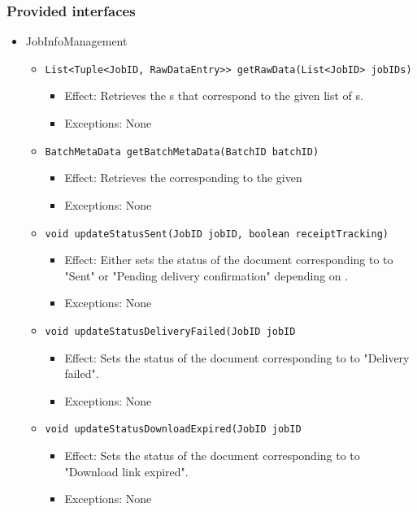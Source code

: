 \subsubsection*{Provided interfaces}
\begin{itemize}
    \item JobInfoManagement
    \begin{itemize}
        \item \texttt{List<Tuple<JobID, RawDataEntry>> getRawData(List<JobID> jobIDs)}
        \begin{itemize}
            \item Effect: Retrieves the s that correspond to the given list of s.
            \item Exceptions: None
        \end{itemize}

        \item \texttt{BatchMetaData getBatchMetaData(BatchID batchID)}
		\begin{itemize}
            \item Effect: Retrieves the  corresponding to the given 
            \item Exceptions: None
        \end{itemize}

		\item \texttt{void updateStatusSent(JobID jobID, boolean receiptTracking)}
		\begin{itemize}
            \item Effect: Either sets the status of the document corresponding to  to "Sent" or "Pending delivery confirmation" depending on .
            \item Exceptions: None
        \end{itemize}

		\item \texttt{void updateStatusDeliveryFailed(JobID jobID}
		\begin{itemize}
            \item Effect: Sets the status of the document corresponding to  to "Delivery failed".
            \item Exceptions: None
        \end{itemize}

		\item \texttt{void updateStatusDownloadExpired(JobID jobID}
		\begin{itemize}
            \item Effect: Sets the status of the document corresponding to  to "Download link expired".
            \item Exceptions: None
        \end{itemize}


\end{itemize}
\end{itemize}
